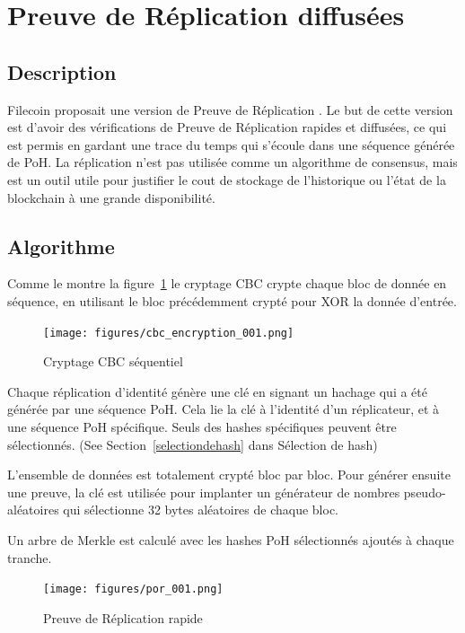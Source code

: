 \documentclass[12pt]{article}
\begin{document}
\section{Preuve de Réplication diffusées}\label{porep}
\subsection{Description}
Filecoin proposait une version de Preuve de Réplication \cite{filecoinporep}. Le but de cette version est d’avoir des vérifications de Preuve de Réplication rapides et diffusées, ce qui est permis en gardant une trace du temps qui s’écoule dans une séquence générée de PoH. La réplication n’est pas utilisée comme un algorithme de consensus, mais est un outil utile pour justifier le cout de stockage de l’historique ou l’état de la blockchain à une grande disponibilité.
\subsection{Algorithme}
Comme le montre la figure~\ref{fig:encrypt} le cryptage CBC crypte chaque bloc de donnée en séquence, en utilisant le bloc précédemment crypté pour XOR la donnée d’entrée.

\begin{figure}[h]
  \begin{center}
    \centering
    \texttt{[image: figures/cbc\_encryption\_001.png]}
    \caption[Fig 7]{Cryptage CBC séquentiel\label{fig:encrypt}}
  \end{center}
  \end{figure}

Chaque réplication d’identité génère une clé en signant un hachage qui a été générée par une séquence PoH. Cela lie la clé à l’identité d’un réplicateur, et à une séquence PoH spécifique. Seuls des hashes spécifiques peuvent être sélectionnés. (See Section~\ref{selectiondehash} dans Sélection de hash)

L’ensemble de données est totalement crypté bloc par bloc. Pour générer ensuite une preuve, la clé est utilisée pour implanter un générateur de nombres pseudo-aléatoires qui sélectionne 32 bytes aléatoires de chaque bloc.

Un arbre de Merkle est calculé avec les hashes PoH sélectionnés ajoutés à chaque tranche.

\begin{figure}[h]
  \begin{center}
    \centering
    \texttt{[image: figures/por\_001.png]}
    \caption[Fig 8]{Preuve de Réplication rapide \label{fig_8}}
  \end{center}
  \end{figure}
\end{document}
